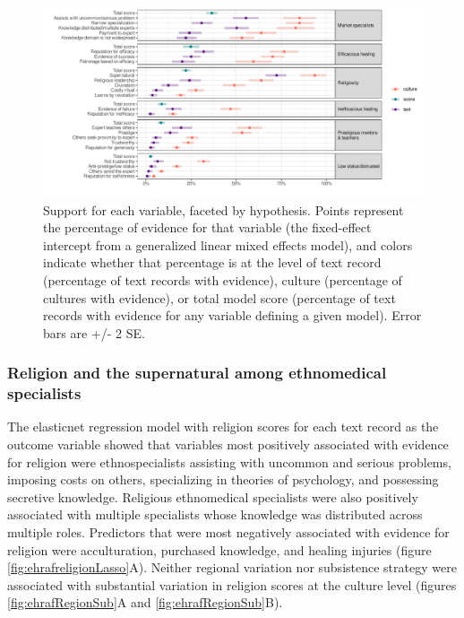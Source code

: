 \documentclass[
  11pt,
]{article}
\begin{document}
\begin{figure}[p]

{\centering \includegraphics{magic-healers-article2_files/figure-latex/ehrafReligiousEvidence-1} 

}

\caption{Support for each variable, faceted by hypothesis. Points represent the percentage of evidence for that variable (the fixed-effect intercept from a generalized linear mixed effects model), and colors indicate whether that percentage is at the level of text record (percentage of text records with evidence), culture (percentage of cultures with evidence), or total model score (percentage of text records with evidence for any variable defining a given model). Error bars are +/- 2 SE.}\label{fig:ehrafReligiousEvidence}
\end{figure}

\hypertarget{religion-and-the-supernatural-among-ethnomedical-specialists}{%
\subsubsection{Religion and the supernatural among ethnomedical specialists}\label{religion-and-the-supernatural-among-ethnomedical-specialists}}

The elasticnet regression model with religion scores for each text record as the outcome variable showed that variables most positively associated with evidence for religion were ethnospecialists assisting with uncommon and serious problems, imposing costs on others, specializing in theories of psychology, and possessing secretive knowledge. Religious ethnomedical specialists were also positively associated with multiple specialists whose knowledge was distributed across multiple roles. Predictors that were most negatively associated with evidence for religion were acculturation, purchased knowledge, and healing injuries (figure \ref{fig:ehrafreligionLasso}A). Neither regional variation nor subsistence strategy were associated with substantial variation in religion scores at the culture level (figures \ref{fig:ehrafRegionSub}A and \ref{fig:ehrafRegionSub}B).
\end{document}
